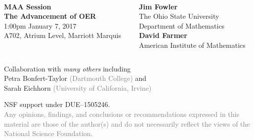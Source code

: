 \documentclass{chalkboard}
\begin{document}
\whitebackground

\clearbackgroundpicture
\begin{frame}[nofills]
  \vspace{5ex}

  \large
   \\[1ex]

  \vfill
  
  \color{osugray}

  \begin{columns}
    \begin{column}{0.49\textwidth}
      \large
      \vspace{2ex}

      \textbf{MAA Session} \\
      \textbf{The Advancement of OER} \\
      1:00pm January 7, 2017 \\
      A702, Atrium Level, Marriott Marquis

    \end{column}

    \hfill
    \begin{column}{0.5\textwidth}
      \large
      \textsf{\textbf{Jim Fowler}} \\
      \textsf{The Ohio State University} \\
      \textsf{Department of Mathematics} \\[2ex]

      \textsf{\textbf{David Farmer}} \\
      \textsf{American Institute of Mathematics} \\
    \end{column}

\end{columns}
  
\end{frame}

\begin{frame}
  \huge

  Collaboration with \textit{many others} including\\
  \quad Petra Bonfert-Taylor \textcolor{gray}{(Dartmouth College)} and \\
  \quad Sarah Eichhorn \textcolor{gray}{(University of California, Irvine)}

  \vfill

  NSF support under DUE--1505246. \\

  \textcolor{gray}{Any opinions, findings, and conclusions or
    recommendations expressed in this material are those of the
    author(s) and do not necessarily reflect the views of the National
    Science Foundation.}

\end{frame}
\end{document}
